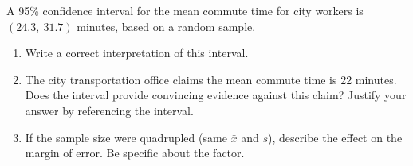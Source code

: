 \documentclass[10pt]{article}
\begin{document}
\namedateperiod

\vspace{0.1in}
A 95\% confidence interval for the mean commute time for city workers is
$(24.3,\ 31.7)$ minutes, based on a random sample.

\begin{enumerate}

  \item Write a correct interpretation of this interval.


  \item The city transportation office claims the mean commute time is 22 minutes.
        Does the interval provide convincing evidence against this claim?
        Justify your answer by referencing the interval.


  \item If the sample size were quadrupled (same $\bar x$ and $s$), describe the
        effect on the margin of error. Be specific about the factor.


\end{enumerate}
\end{document}
